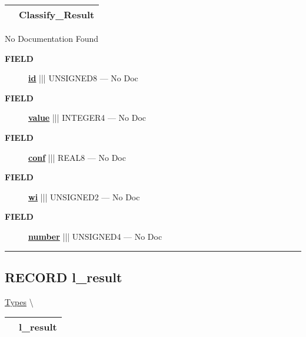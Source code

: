 {\renewcommand{\arraystretch}{1.5}
\begin{tabularx}{\textwidth}{|>{\raggedright\arraybackslash}l|X|}
\hline
\hspace{0pt}\mytexttt{\color{red} } & \textbf{Classify\_Result} \\
\hline
\end{tabularx}
}

\par





No Documentation Found







\par
\begin{description}
\item [\colorbox{tagtype}{\color{white} \textbf{\textsf{FIELD}}}] \textbf{\underline{id}} ||| UNSIGNED8 --- No Doc
\item [\colorbox{tagtype}{\color{white} \textbf{\textsf{FIELD}}}] \textbf{\underline{value}} ||| INTEGER4 --- No Doc
\item [\colorbox{tagtype}{\color{white} \textbf{\textsf{FIELD}}}] \textbf{\underline{conf}} ||| REAL8 --- No Doc
\item [\colorbox{tagtype}{\color{white} \textbf{\textsf{FIELD}}}] \textbf{\underline{wi}} ||| UNSIGNED2 --- No Doc
\item [\colorbox{tagtype}{\color{white} \textbf{\textsf{FIELD}}}] \textbf{\underline{number}} ||| UNSIGNED4 --- No Doc
\end{description}





\rule{\linewidth}{0.5pt}
\subsection*{\textsf{\colorbox{headtoc}{\color{white} RECORD}
l\_result}}

\hypertarget{ecldoc:ml_core.types.l_result}{}
\hspace{0pt} \hyperlink{ecldoc:ML_Core.Types}{Types} \textbackslash 

{\renewcommand{\arraystretch}{1.5}
\begin{tabularx}{\textwidth}{|>{\raggedright\arraybackslash}l|X|}
\hline
\hspace{0pt}\mytexttt{\color{red} } & \textbf{l\_result} \\
\hline
\end{tabularx}
}

